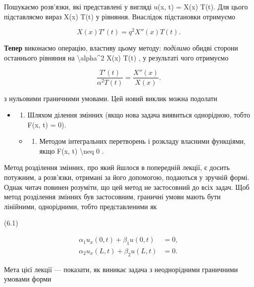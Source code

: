 \documentclass[
]{article}
\providecommand{\tightlist}{%
  \setlength{\itemsep}{0pt}\setlength{\parskip}{0pt}}
\begin{document}
Пошукаємо розв'язки, які представлені у вигляді u(x, t) = X(x) T(t). Для
цього підставляємо вираз X(x) T(t) у рівняння. Внаслідок підстановки
отримуємо

\[
X(x) T'(t) = q^2 X''(x) T(t).
\]

\textbf{Тепер} виконаємо операцію, властиву цьому методу:
\emph{поділимо} обидві сторони останнього рівняння на
\textbackslash alpha\^{}2 X(x) T(t) , у результаті чого отримуємо

\[
\frac{T'(t)}{\alpha^2 T(t)} = \frac{X''(x)}{X(x)}.
\]

з нульовими граничними умовами. Цей новий виклик можна подолати

\begin{itemize}
\item
  \begin{enumerate}
  \def\labelenumi{\arabic{enumi}.}
  \tightlist
  \item
    Шляхом ділення змінних (якщо нова задача виявиться однорідною, тобто
    F(x, t) = 0).
  \end{enumerate}

  \begin{itemize}
  \tightlist
  \item
    \begin{enumerate}
    \def\labelenumi{\arabic{enumi}.}
    \setcounter{enumi}{1}
    \tightlist
    \item
      Методом інтегральних перетворень і розкладу власними функціями,
      якщо F(x, t) \textbackslash neq 0 .
    \end{enumerate}
  \end{itemize}
\end{itemize}

Метод розділення змінних, про який йшлося в попередній лекції, є досить
потужним, а розв'язки, отримані за його допомогою, подаються у зручній
формі. Однак читач повинен розуміти, що цей метод не застосовний до всіх
задач. Щоб метод розділення змінних був застосовним, граничні умови
мають бути лінійними, однорідними, тобто представленими як

(6.1)

\[
\begin{aligned} \alpha_1 u_x(0, t) + \beta_1 u(0, t) &= 0, \\ \alpha_2 u_x(L, t) + \beta_2 u(L, t) &= 0. \end{aligned}
\]

Мета цієї лекції --- показати, як виникає задача з неоднорідними
граничними умовами форми
\end{document}

